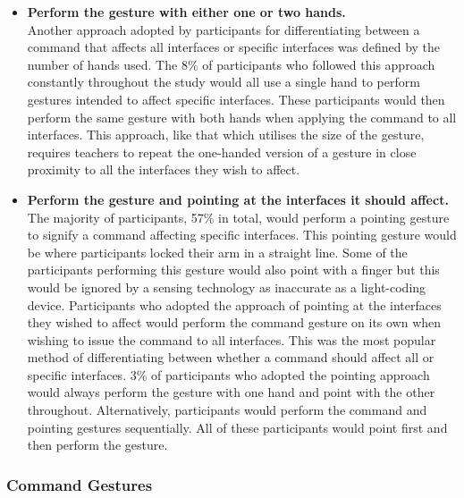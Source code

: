 \documentclass[link]{IWCOMP}
\begin{document}
\begin{itemize}
\item \textbf{Perform the gesture with either one or two hands.}\\
Another approach adopted by participants for differentiating between a command that affects all interfaces or specific interfaces was defined by the number of hands used. 
The 8\% of participants who followed this approach constantly throughout the study would all use a single hand to perform gestures intended to affect specific interfaces.
These participants would then perform the same gesture with both hands when applying the command to all interfaces.
This approach, like that which utilises the size of the gesture, requires teachers to repeat the one-handed version of a gesture in close proximity to all the interfaces they wish to affect.

\item \textbf{Perform the gesture and pointing at the interfaces it should affect.}\\
The majority of participants, 57\% in total, would perform a pointing gesture to signify a command affecting specific interfaces.
This pointing gesture would be where participants locked their arm in a straight line.
Some of the participants performing this gesture would also point with a finger but this would be ignored by a sensing technology as inaccurate as a light-coding device.
Participants who adopted the approach of pointing at the interfaces they wished to affect would perform the command gesture on its own when wishing to issue the command to all interfaces.
This was the most popular method of differentiating between whether a command should affect all or specific interfaces.
3\% of participants who adopted the pointing approach would always perform the gesture with one hand and point with the other throughout.
Alternatively, participants would perform the command and pointing gestures sequentially.
All of these participants would point first and then perform the gesture.

\end{itemize}

\subsubsection{Command Gestures}
\label{subsubsec:focusGroupResultsCommandGestures}
\end{document}
